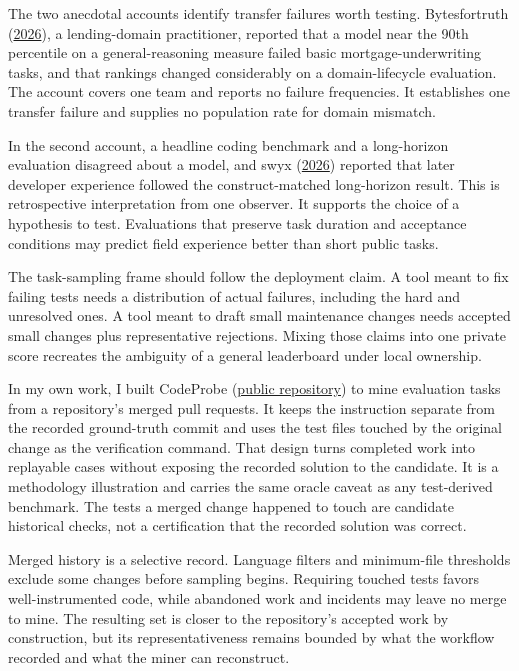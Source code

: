 The two anecdotal accounts identify transfer failures worth testing. Bytesfortruth (\href{https://www.reddit.com/r/compsci/comments/1rqcmu8/}{2026}), a lending-domain practitioner, reported that a model near the 90th percentile on a general-reasoning measure failed basic mortgage-underwriting tasks, and that rankings changed considerably on a domain-lifecycle evaluation. The account covers one team and reports no failure frequencies. It establishes one transfer failure and supplies no population rate for domain mismatch.

In the second account, a headline coding benchmark and a long-horizon evaluation disagreed about a model, and swyx (\href{https://x.com/swyx/status/2011344788486774942}{2026}) reported that later developer experience followed the construct-matched long-horizon result. This is retrospective interpretation from one observer. It supports the choice of a hypothesis to test. Evaluations that preserve task duration and acceptance conditions may predict field experience better than short public tasks.

The task-sampling frame should follow the deployment claim. A tool meant to fix failing tests needs a distribution of actual failures, including the hard and unresolved ones. A tool meant to draft small maintenance changes needs accepted small changes plus representative rejections. Mixing those claims into one private score recreates the ambiguity of a general leaderboard under local ownership.

In my own work, I built CodeProbe (\href{https://github.com/sjarmak/codeprobe}{public repository}) to mine evaluation tasks from a repository's merged pull requests. It keeps the instruction separate from the recorded ground-truth commit and uses the test files touched by the original change as the verification command. That design turns completed work into replayable cases without exposing the recorded solution to the candidate. It is a methodology illustration and carries the same oracle caveat as any test-derived benchmark. The tests a merged change happened to touch are candidate historical checks, not a certification that the recorded solution was correct.

Merged history is a selective record. Language filters and minimum-file thresholds exclude some changes before sampling begins. Requiring touched tests favors well-instrumented code, while abandoned work and incidents may leave no merge to mine. The resulting set is closer to the repository's accepted work by construction, but its representativeness remains bounded by what the workflow recorded and what the miner can reconstruct.

